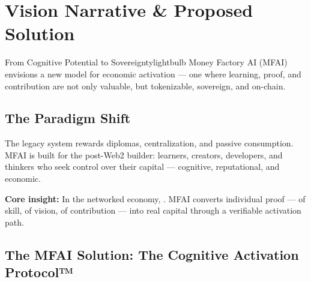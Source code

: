 \section{Vision Narrative \& Proposed Solution}

\begin{mfai-box}{From Cognitive Potential to Sovereignty}{lightbulb}
Money Factory AI (MFAI) envisions a new model for economic activation — one where learning, proof, and contribution are not only valuable, but tokenizable, sovereign, and on-chain.
\end{mfai-box}

\vspace{1em}

\subsection*{The Paradigm Shift}

The legacy system rewards diplomas, centralization, and passive consumption. MFAI is built for the post-Web2 builder: learners, creators, developers, and thinkers who seek control over their capital — cognitive, reputational, and economic.

\vspace{0.5em}

\textbf{Core insight:} In the networked economy, . MFAI converts individual proof — of skill, of vision, of contribution — into real capital through a verifiable activation path.

\vspace{1.5em}

\subsection*{The MFAI Solution: The Cognitive Activation Protocol™}

